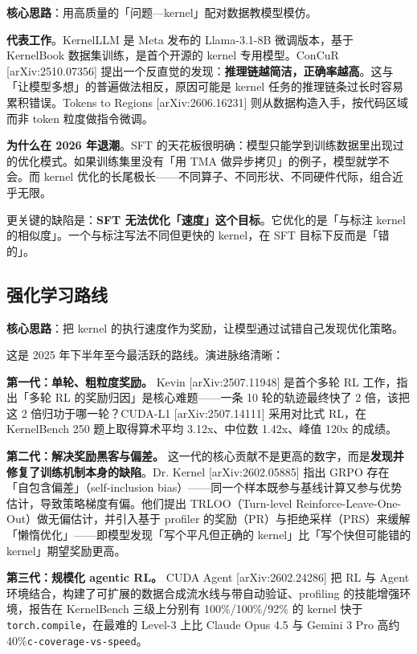 \textbf{核心思路}：用高质量的「问题—kernel」配对数据教模型模仿。


\textbf{代表工作}。KernelLLM 是 Meta 发布的 Llama-3.1-8B 微调版本，基于 KernelBook 数据集训练，是首个开源的 kernel 专用模型。ConCuR [arXiv:2510.07356] 提出一个反直觉的发现：\textbf{推理链越简洁，正确率越高}。这与「让模型多想」的普遍做法相反，原因可能是 kernel 任务的推理链条过长时容易累积错误。Tokens to Regions [arXiv:2606.16231] 则从数据构造入手，按代码区域而非 token 粒度做指令微调。


\textbf{为什么在 2026 年退潮}。SFT 的天花板很明确：模型只能学到训练数据里出现过的优化模式。如果训练集里没有「用 TMA 做异步拷贝」的例子，模型就学不会。而 kernel 优化的长尾极长——不同算子、不同形状、不同硬件代际，组合近乎无限。


更关键的缺陷是：\textbf{SFT 无法优化「速度」这个目标}。它优化的是「与标注 kernel 的相似度」。一个与标注写法不同但更快的 kernel，在 SFT 目标下反而是「错的」。


\subsection{强化学习路线}

\textbf{核心思路}：把 kernel 的执行速度作为奖励，让模型通过试错自己发现优化策略。


这是 2025 年下半年至今最活跃的路线。演进脉络清晰：


\textbf{第一代：单轮、粗粒度奖励。} Kevin [arXiv:2507.11948] 是首个多轮 RL 工作，指出「多轮 RL 的奖励归因」是核心难题——一条 10 轮的轨迹最终快了 2 倍，该把这 2 倍归功于哪一轮？CUDA-L1 [arXiv:2507.14111] 采用对比式 RL，在 KernelBench 250 题上取得算术平均 3.12x、中位数 1.42x、峰值 120x 的成绩。


\textbf{第二代：解决奖励黑客与偏差。} 这一代的核心贡献不是更高的数字，而是\textbf{发现并修复了训练机制本身的缺陷}。Dr. Kernel [arXiv:2602.05885] 指出 GRPO 存在「自包含偏差」（self-inclusion bias）——同一个样本既参与基线计算又参与优势估计，导致策略梯度有偏。他们提出 TRLOO（Turn-level Reinforce-Leave-One-Out）做无偏估计，并引入基于 profiler 的奖励（PR）与拒绝采样（PRS）来缓解「懒惰优化」——即模型发现「写个平凡但正确的 kernel」比「写个快但可能错的 kernel」期望奖励更高。


\textbf{第三代：规模化 agentic RL。} CUDA Agent [arXiv:2602.24286] 把 RL 与 Agent 环境结合，构建了可扩展的数据合成流水线与带自动验证、profiling 的技能增强环境，报告在 KernelBench 三级上分别有 100\%/100\%/92\% 的 kernel 快于 \texttt{torch.compile}，在最难的 Level-3 上比 Claude Opus 4.5 与 Gemini 3 Pro 高约 40\%{\scriptsize\texttt{c-\hspace{0pt}coverage-\hspace{0pt}vs-\hspace{0pt}speed}}。


